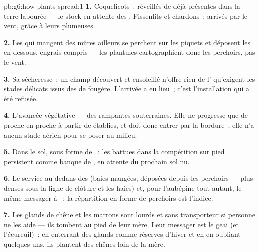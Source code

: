 \begin{solution}{pb:g6:how-plants-spread:1}
\textbf{1.} Coquelicots~: réveillés de  déjà présentes dans
la terre labourée --- le stock en attente des . Pissenlits
et chardons~: arrivés par le vent, grâce à leurs  plumeuses.

\textbf{2.} Les  qui mangent des mûres ailleurs se perchent
sur les piquets et déposent les  en dessous, engrais compris
--- les plantules cartographient donc les perchoirs, pas le vent.

\textbf{3.} Sa sécheresse~: un champ découvert et ensoleillé n'offre
rien de l' qu'exigent les stades délicats issus des 
de fougère. L'arrivée a eu lieu~; c'est l'installation qui a été
refusée.

\textbf{4.} L'avancée végétative --- des  rampantes
souterraines. Elle ne progresse que de proche en proche à partir de
 établies, et doit donc entrer par la bordure~; elle n'a
aucun stade aérien pour se poser au milieu.

\textbf{5.} Dans le sol, sous forme de ~: les 
battues dans la compétition sur pied persistent comme banque de
, en attente du prochain sol nu.

\textbf{6.} Le service au-dedans des  (baies mangées, 
déposées depuis les perchoirs --- plus denses sous la ligne de
clôture et les haies) et, pour l'aubépine tout autant, le même
messager à ~; la répartition en forme de perchoirs est
l'indice.

\textbf{7.} Les glands de chêne et les marrons sont lourds et sans
transporteur si personne ne les aide --- ils tombent au pied de leur
mère. Leur messager est le geai (et l'écureuil)~: en enterrant des
glands comme réserves d'hiver et en en oubliant quelques-uns, ils
plantent des chênes loin de la mère.


\end{solution}

